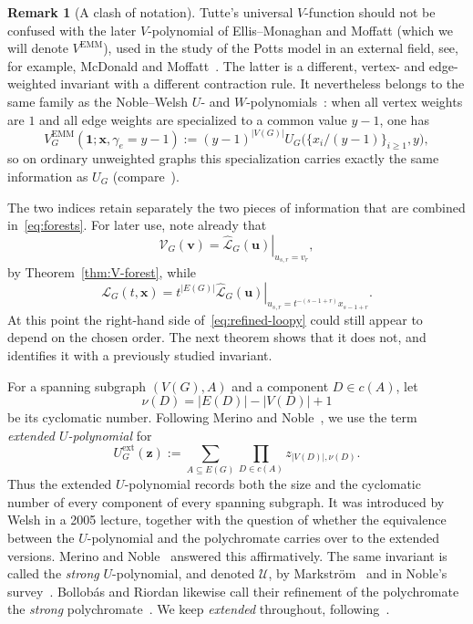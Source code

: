 \documentclass[11pt]{article}
\theoremstyle{plain}
\theoremstyle{definition}
\newtheorem{remark}[theorem]{Remark}
\renewcommand{\mathcal}{\mathscr}
\newcommand{\LL}{\mathcal{L}}    %
\newcommand{\cU}{\mathcal{U}}    %
\newcommand{\cV}{\mathcal{V}}    %
\newcommand{\bu}{\mathbf{u}}
\newcommand{\bv}{\mathbf{v}}
\newcommand{\bx}{\mathbf{x}}
\newcommand{\bz}{\mathbf{z}}
\newcommand{\bOne}{\mathbf{1}}
\newcommand{\ext}{\mathrm{ext}}
\numberwithin{equation}{section}
\begin{document}
\begin{remark}[A clash of notation]\label{rem:V-EMM}
  Tutte's universal $V$-function should not be confused with the later $V$-polynomial of Ellis--Monaghan and Moffatt (which we will denote $V^{\mathrm{EMM}}$), used in the study of the Potts model in an external field, see, for example, McDonald and Moffatt~\cite{MM}. The latter is a different, vertex- and edge-weighted invariant with a different contraction rule.  It nevertheless belongs to the same family as the Noble--Welsh $U$- and $W$-polynomials~\cite{NW,Nob}: when
all vertex weights are $1$ and all edge weights are specialized to a common value $y-1$, one has
\[
 V_G^{\mathrm{EMM}}(\bOne;\bx,\gamma_e=y-1)
 :=(y-1)^{|V(G)|}
 U_G\bigl(\{x_i/(y-1)\}_{i\ge 1},y\bigr),
\]
so on ordinary unweighted graphs this specialization carries exactly the same information as $U_G$ (compare~\cite{Nob,MM}).
\end{remark}

The two indices retain separately the two pieces of information that are combined in~\eqref{eq:forests}.  For later use, note already that
\begin{equation}\label{eq:refined-to-V}
   \cV_G(\bv)
   =
   \left.
      \widehat{\LL}_G(\bu)
   \right|_{u_{s,r}=v_r},
\end{equation}
by Theorem~\ref{thm:V-forest}, while
\begin{equation}\label{eq:refined-to-loopy}
   \LL_G(t,\bx)
   =
   t^{|E(G)|}
   \left.
      \widehat{\LL}_G(\bu)
   \right|_{
      u_{s,r}=t^{-(s-1+r)}x_{s-1+r}
   }.
\end{equation}
At this point the right-hand side of~\eqref{eq:refined-loopy} could still appear to depend on the chosen order.  The next theorem shows that it does not, and identifies it with a previously studied invariant.

For a spanning subgraph $(V(G),A)$ and a component $D\in c(A)$, let
\[
   \nu(D)=|E(D)|-|V(D)|+1
\]
be its cyclomatic number.  Following Merino and Noble~\cite{MN}, we use the term \emph{extended $U$-polynomial} for
\begin{equation}\label{eq:extended-U}
   U_G^{\ext}(\bz)
   :=
   \sum_{A\subseteq E(G)}
   \prod_{D\in c(A)}
   z_{|V(D)|,\nu(D)}.
\end{equation}
Thus the extended $U$-polynomial records both the size and the cyclomatic
number of every component of every spanning subgraph.  It was introduced by
Welsh in a 2005 lecture, together with the question of whether the
equivalence between the $U$-polynomial and the polychromate carries over to
the extended versions.  Merino and Noble~\cite{MN} answered this affirmatively.
The same invariant is called the \emph{strong} $U$-polynomial, and denoted $\cU$,
by Markstr\"om~\cite{Mar} and in Noble's  survey~\cite[Definition~26.13]{Nob}.
Bollob\'as and Riordan likewise call their refinement of the polychromate the
\emph{strong} polychromate~\cite[\S3]{BR}.  We keep \emph{extended} throughout, following~\cite{MN}.
\end{document}
